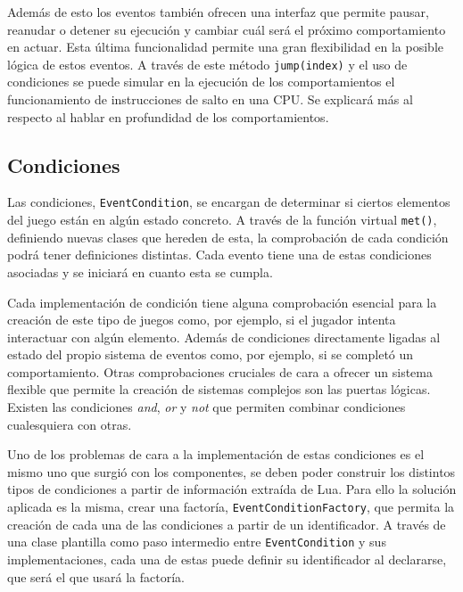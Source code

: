 \medskip

Además de esto los eventos también ofrecen una interfaz que permite pausar, reanudar o detener su ejecución y cambiar cuál será el próximo comportamiento en actuar. Esta última funcionalidad permite una gran flexibilidad en la posible lógica de estos eventos. A través de este método \texttt{jump(index)} y el uso de condiciones se puede simular en la ejecución de los comportamientos el funcionamiento de instrucciones de salto en una CPU. Se explicará más al respecto al hablar en profundidad de los comportamientos. 


\subsection{Condiciones}
Las condiciones, \texttt{EventCondition}, se encargan de determinar si ciertos elementos del juego están en algún estado concreto. A través de la función virtual \texttt{met()}, definiendo nuevas clases que hereden de esta, la comprobación de cada condición podrá tener definiciones distintas. Cada evento tiene una de estas condiciones asociadas y se iniciará en cuanto esta se cumpla. 

\medskip

Cada implementación de condición tiene alguna comprobación esencial para la creación de este tipo de juegos como, por ejemplo, si el jugador intenta interactuar con algún elemento. Además de condiciones directamente ligadas al estado del propio sistema de eventos como, por ejemplo, si se completó un comportamiento. Otras comprobaciones cruciales de cara a ofrecer un sistema flexible que permite la creación de sistemas complejos son las puertas lógicas. Existen las condiciones \textit{and}, \textit{or} y \textit{not} que permiten combinar condiciones cualesquiera con otras. 

\medskip

Uno de los problemas de cara a la implementación de estas condiciones es el mismo uno que surgió con los componentes, se deben poder construir los distintos tipos de condiciones a partir de información extraída de Lua. Para ello la solución aplicada es la misma, crear una factoría, \texttt{EventConditionFactory}, que permita la creación de cada una de las condiciones a partir de un identificador. A través de una clase plantilla como paso intermedio entre \texttt{EventCondition} y sus implementaciones, cada una de estas puede definir su identificador al declararse, que será el que usará la factoría. 

